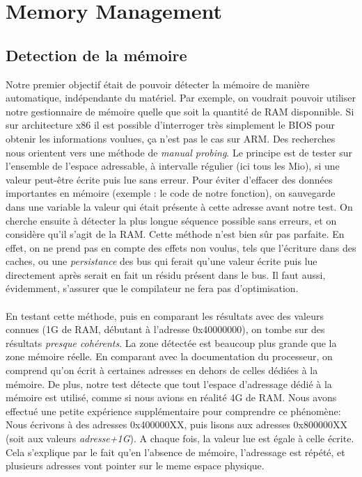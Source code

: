 \documentclass[frenchb]{article}
\begin{document}
\section{Memory Management}

\subsection{Detection de la mémoire}
Notre premier objectif était de pouvoir détecter la mémoire de manière automatique, indépendante du matériel. Par exemple, on voudrait pouvoir utiliser notre gestionnaire de mémoire quelle que soit la quantité de RAM disponnible.  Si sur architecture x86 il est possible d'interroger très simplement le BIOS pour obtenir les informations voulues, ça n'est pas le cas sur ARM. Des recherches nous orientent vers une méthode de \textit{manual probing}. Le principe est de tester sur l'ensemble de l'espace adressable, à intervalle régulier (ici tous les Mio), si une valeur peut-être écrite puis lue sans erreur. Pour éviter d'effacer des données importantes en mémoire (exemple : le code de notre fonction), on sauvegarde dans une variable la valeur qui était présente à cette adresse avant notre test. On cherche ensuite à détecter la plus longue séquence possible sans erreurs, et on considère qu'il s'agit de la RAM. Cette méthode n'est bien sûr pas parfaite. En effet, on ne prend pas en compte des effets non voulus, tels que l'écriture dans des caches, ou une \textit{persistance} des bus qui ferait qu'une valeur écrite puis lue directement après serait en fait un résidu présent dans le bus. Il faut aussi, évidemment, s'assurer que le compilateur ne fera pas d'optimisation. \\ \\
En testant cette méthode, puis en comparant les résultats avec des valeurs connues (1G de RAM, débutant à l'adresse 0x40000000), on tombe sur des résultats \textit{presque cohérents}. La zone détectée est beaucoup plus grande que la zone mémoire réelle. En comparant avec la documentation du processeur, on comprend qu'on écrit à certaines adresses en dehors de celles dédiées à la mémoire. De plus, notre test détecte que tout l'espace d'adressage dédié à la mémoire est utilisé, comme si nous avions en réalité 4G de RAM. Nous avons effectué une petite expérience supplémentaire pour comprendre ce phénomène:\\
Nous écrivons à des adresses 0x400000XX, puis lisons aux adresses 0x800000XX (soit aux valeurs \textit{adresse+1G}). A chaque fois, la valeur lue est égale à celle écrite. Cela s'explique par le fait qu'en l'absence de mémoire, l'adressage est répété, et plusieurs adresses vont pointer sur le meme espace physique.\\ \\
\end{document}
